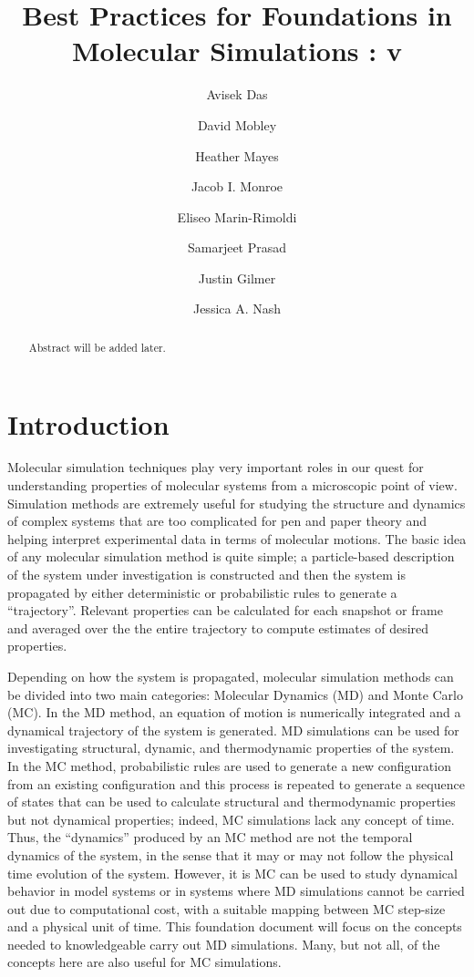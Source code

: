 \documentclass[9pt,bestpractices]{livecoms}
\title{Best Practices for Foundations in Molecular Simulations : v\versionnumber}
\author[1*]{Avisek Das}
\author[2]{David Mobley}
\author[1]{Heather Mayes}
\author[3]{Jacob I. Monroe}
\author[4]{Eliseo Marin-Rimoldi}
\author[5]{Samarjeet Prasad}
\author[6]{Justin Gilmer}
\author[7]{Jessica A. Nash}
\affil[1]{University of Michigan}
\affil[2]{University of California, Irvine}
\affil[3]{University of California, Santa Barbara}
\affil[4]{Univ 4}
\affil[5]{National Institutes of Standard and Technology}
\affil[6]{Univ 5}
\affil[7]{Univ 6}
\begin{document}
\begin{frontmatter}
\maketitle

\begin{abstract}
Abstract will be added later.
\end{abstract}
\end{frontmatter}

\section{Introduction}

Molecular simulation techniques play very important roles in our quest for understanding properties of molecular systems from a microscopic point of view. Simulation methods are extremely useful for studying the structure and dynamics of complex systems that are too complicated for pen and paper theory and helping interpret experimental data in terms of molecular motions. The basic idea of any molecular simulation method is quite simple; a particle-based description of the system under investigation is constructed and then the system is propagated by either deterministic or probabilistic rules to generate a “trajectory”. Relevant properties can be calculated for each snapshot or frame and averaged over the the entire trajectory to compute estimates of desired properties. 

Depending on how the system is propagated, molecular simulation methods can be divided into two main categories: Molecular Dynamics (MD) and Monte Carlo (MC). In the MD method, an equation of motion is numerically integrated and a dynamical trajectory of the system is generated. MD simulations can be used for investigating structural, dynamic, and thermodynamic properties of the system. In the MC method, probabilistic rules are used to generate a new configuration from an existing configuration and this process is repeated to generate a sequence of states that can be used to calculate structural and thermodynamic properties but not dynamical properties; indeed, MC simulations lack any concept of time. Thus, the “dynamics” produced by an MC method are not the temporal dynamics of the system, in the sense that it may or may not follow the physical time evolution of the system. However, it is MC can be used  to study dynamical behavior in model systems or in systems where MD simulations cannot be carried out due to computational cost, with a suitable mapping between MC step-size and a physical unit of time. This foundation document will focus on the concepts needed to knowledgeable carry out MD simulations. Many, but not all, of the concepts here are also useful for MC simulations. 
\end{document}
